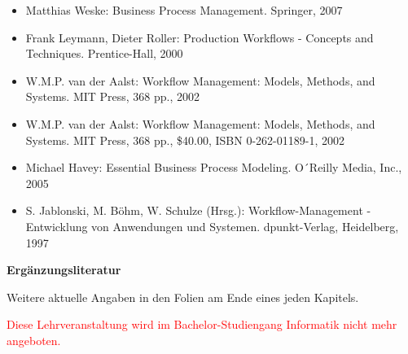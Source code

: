 \begin{course}
\begin{literature}
 \begin{itemize}\item Matthias Weske: Business Process Management. Springer, 2007  \item Frank Leymann, Dieter Roller: Production Workflows - Concepts and Techniques. Prentice-Hall, 2000  \item W.M.P. van der Aalst: Workflow Management: Models, Methods, and Systems. MIT Press, 368 pp., 2002  \item W.M.P. van der Aalst: Workflow Management: Models, Methods, and Systems. MIT Press, 368 pp., \$40.00, ISBN 0-262-01189-1, 2002  \item Michael Havey: Essential Business Process Modeling. O´Reilly Media, Inc., 2005  \item S. Jablonski, M. Böhm, W. Schulze (Hrsg.): Workflow-Management - Entwicklung von Anwendungen und Systemen. dpunkt-Verlag, Heidelberg, 1997  \end{itemize}

\textbf{Ergänzungsliteratur}

 

Weitere aktuelle Angaben in den Folien am Ende eines jeden Kapitels.

\end{literature}

\begin{remarks}\textcolor{red}{Diese Lehrveranstaltung wird im Bachelor-Studiengang Informatik nicht mehr angeboten.}

\end{remarks}

\end{course}